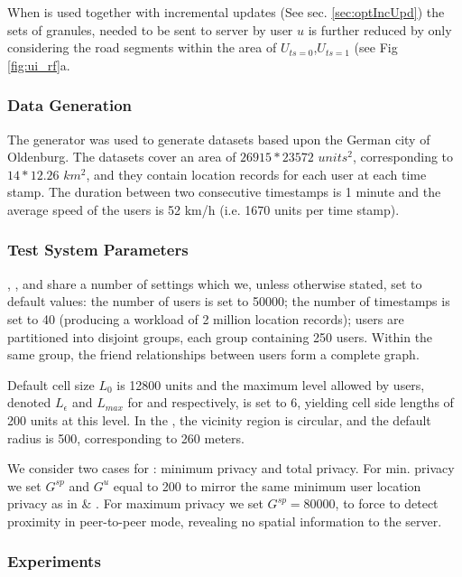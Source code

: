 When \rf is used together with incremental updates (See sec. 
\ref{sec:optIncUpd}) the sets of granules, needed to be sent to server 
by user $u$ is further reduced by only considering the road segments within the
area of $U_{ts=0}$,$U_{ts=1}$ (see Fig \ref{fig:ui_rf}a.


\subsubsection{Data Generation}
The generator \cite{brinkhoff} was used to generate datasets based upon the
German city of Oldenburg. The datasets cover an area of $26915*23572$
$units^2$, corresponding to $14*12.26$ $km^2$, and they contain location
records for each user at each time stamp. The duration between two consecutive
timestamps is 1 minute and the average speed of the users is 52 km/h (i.e. 1670
units per time stamp).

\subsubsection{Test System Parameters}
\hc, \ff, and \vl share a number of settings which we,
unless otherwise stated, set to default values: the number of users is set to
50000; the number of timestamps is set to 40 (producing a workload
of 2 million location records); users are partitioned into disjoint
groups, each group containing 250 users. Within the same group, the
friend relationships between users form a complete graph.

Default cell size $L_0$ is 12800 units and the maximum level allowed by users,
denoted $L_{\epsilon}$ and $L_{max}$ for \ff and \vl respectively, is set to 6,
yielding cell side lengths of 200 units at this level. In the \vl, the vicinity
region is circular, and the default radius is 500, corresponding to 260 meters.

We consider two cases for \hc: minimum privacy and total privacy. For min.
privacy we set $G^{sp}$ and $G^{u}$ equal to 200 to mirror the same minimum user
location privacy as in \vl \& \ff. For maximum privacy we set $G^{sp}=80000$, to
force \hc to detect proximity in peer-to-peer mode, revealing no spatial
information to the server.

\subsubsection{Experiments}

